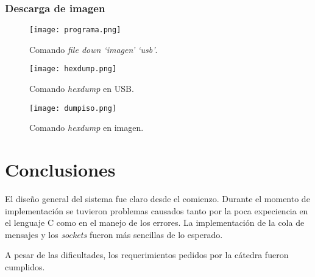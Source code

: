 \documentclass[12pt,a4paper]{article}
\begin{document}
\subsubsection{Descarga de imagen}
\label{down}

\begin{figure}[H]
  \centering
  \texttt{[image: programa.png]}
  \caption{Comando \emph{file down `imagen' `usb'}.}
  \label{filedown}
\end{figure}

\begin{figure}[H]
  \centering
  \texttt{[image: hexdump.png]}
  \caption{Comando \emph{hexdump} en USB.}
  \label{dumpusb}
\end{figure}

\begin{figure}[H]
  \centering
  \texttt{[image: dumpiso.png]}
  \caption{Comando \emph{hexdump} en imagen.}
  \label{dumpiso}
\end{figure}

\section{Conclusiones}
\label{conc}

El diseño general del sistema fue claro desde el comienzo. Durante el momento
de implementación se tuvieron problemas causados tanto por la poca expeciencia
en el lenguaje C como en el manejo de los errores. La implementación de la cola
de mensajes y los \emph{sockets} fueron más sencillas de lo esperado.

A pesar de las dificultades, los requerimientos pedidos por la cátedra fueron
cumplidos.
\end{document}
